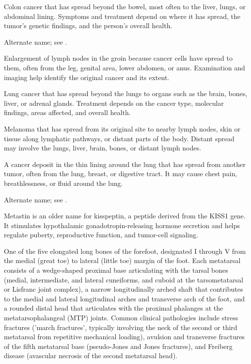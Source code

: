  Colon cancer that has spread beyond the bowel, most often to the liver, lungs, or abdominal lining. Symptoms and treatment depend on where it has spread, the tumor’s genetic findings, and the person’s overall health.

 Alternate name; see .

 Enlargement of lymph nodes in the groin because cancer cells have spread to them, often from the leg, genital area, lower abdomen, or anus. Examination and imaging help identify the original cancer and its extent.

 Lung cancer that has spread beyond the lungs to organs such as the brain, bones, liver, or adrenal glands. Treatment depends on the cancer type, molecular findings, areas affected, and overall health.

 Melanoma that has spread from its original site to nearby lymph nodes, skin or tissue along lymphatic pathways, or distant parts of the body. Distant spread may involve the lungs, liver, brain, bones, or distant lymph nodes.

 A cancer deposit in the thin lining around the lung that has spread from another tumor, often from the lung, breast, or digestive tract. It may cause chest pain, breathlessness, or fluid around the lung.

 Alternate name; see
  .

 Metastin is an older name for kisspeptin, a peptide derived from the KISS1 gene. It stimulates hypothalamic gonadotropin-releasing hormone secretion and helps regulate puberty, reproductive function, and tumor-cell signaling.

 One of the five elongated long bones of the forefoot, designated I through V from the medial (great toe) to lateral (little toe) margin of the foot. Each metatarsal consists of a wedge-shaped proximal base articulating with the tarsal bones (medial, intermediate, and lateral cuneiforms, and cuboid at the tarsometatarsal or Lisfranc joint complex), a narrow longitudinally arched shaft that contributes to the medial and lateral longitudinal arches and transverse arch of the foot, and a rounded distal head that articulates with the proximal phalanges at the metatarsophalangeal (MTP) joints. Common clinical pathologies include stress fractures ('march fractures', typically involving the neck of the second or third metatarsal from repetitive mechanical loading), avulsion and transverse fractures of the fifth metatarsal base (pseudo-Jones and Jones fractures), and Freiberg disease (avascular necrosis of the second metatarsal head).

